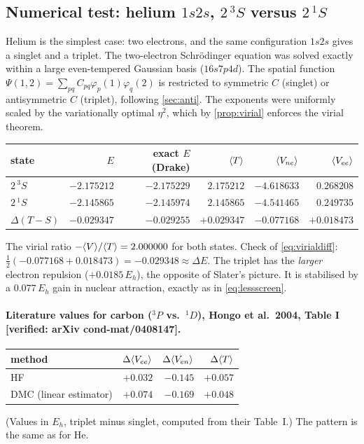 \subsection{Numerical test: helium $1s2s$, $2\,^3S$ versus $2\,^1S$}
Helium is the simplest case: two electrons, and the same configuration $1s2s$ gives a singlet and a triplet.
The two-electron Schr\"odinger equation was solved exactly within a large even-tempered Gaussian basis
($16s7p4d$). The spatial function $\Psi(1,2)=\sum_{pq}C_{pq}\varphi_p(1)\varphi_q(2)$ is restricted to symmetric
$C$ (singlet) or antisymmetric $C$ (triplet), following \cref{sec:anti}. The exponents were uniformly scaled
by the variationally optimal $\eta^2$, which by \cref{prop:virial} enforces the virial theorem.
\begin{center}
\begin{tabular}{lrrrrr}
\toprule
state & $E$ & exact $E$ (Drake) & $\langle T\rangle$ & $\langle V_{ne}\rangle$ & $\langle V_{ee}\rangle$\\
\midrule
$2\,^3S$ & $-2.175212$ & $-2.175229$ & $2.175212$ & $-4.618633$ & $0.268208$\\
$2\,^1S$ & $-2.145865$ & $-2.145974$ & $2.145865$ & $-4.541465$ & $0.249735$\\
\midrule
$\Delta(T-S)$ & $-0.029347$ & $-0.029255$ & $+0.029347$ & $-0.077168$ & $+0.018473$\\
\bottomrule
\end{tabular}
\end{center}
The virial ratio $-\langle V\rangle/\langle T\rangle=2.000000$ for both states. Check of \cref{eq:virialdiff}:
$\tfrac12(-0.077168+0.018473)=-0.029348\approx\Delta E$. The triplet has the \emph{larger} electron
repulsion ($+0.0185\,E_h$), the opposite of Slater's picture. It is stabilised by a $0.077\,E_h$ gain in
nuclear attraction, exactly as in \cref{eq:lessscreen}.

\paragraph{Literature values for carbon ($^3P$ vs.\ $^1D$), Hongo et al.\ 2004, Table I [verified: arXiv cond-mat/0408147].}
\begin{center}
\begin{tabular}{lrrr}
\toprule
method & $\Delta\langle V_{ee}\rangle$ & $\Delta\langle V_{en}\rangle$ & $\Delta\langle T\rangle$\\
\midrule
HF & $+0.032$ & $-0.145$ & $+0.057$\\
DMC (linear estimator) & $+0.074$ & $-0.169$ & $+0.048$\\
\bottomrule
\end{tabular}
\end{center}
(Values in $E_h$, triplet minus singlet, computed from their Table~I.) The pattern is the same as for He.

